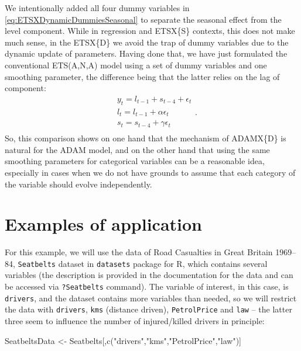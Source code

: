 \documentclass[
]{book}
\newenvironment{Shaded}{\begin{snugshade}}{\end{snugshade}}
\newcommand{\FunctionTok}[1]{\textcolor[rgb]{0.00,0.00,0.00}{#1}}
\newcommand{\NormalTok}[1]{#1}
\newcommand{\OtherTok}[1]{\textcolor[rgb]{0.56,0.35,0.01}{#1}}
\newcommand{\StringTok}[1]{\textcolor[rgb]{0.31,0.60,0.02}{#1}}
\theoremstyle{definition}
\theoremstyle{definition}
\theoremstyle{definition}
\theoremstyle{definition}
\theoremstyle{remark}
\begin{document}
We intentionally added all four dummy variables in \eqref{eq:ETSXDynamicDummiesSeasonal} to separate the seasonal effect from the level component. While in regression and ETSX\{S\} contexts, this does not make much sense, in the ETSX\{D\} we avoid the trap of dummy variables due to the dynamic update of parameters. Having done that, we have just formulated the conventional ETS(A,N,A) model using a set of dummy variables and one smoothing parameter, the difference being that the latter relies on the lag of component:
\begin{equation}
  \begin{aligned}
    & y_{t} = l_{t-1} + s_{t-4} + \epsilon_t \\
    & l_t = l_{t-1} + \alpha \epsilon_t \\
    & s_t = s_{t-4} + \gamma \epsilon_t \\
  \end{aligned} .
  \label{eq:ADAMETSANAQuarterly}
\end{equation}
So, this comparison shows on one hand that the mechanism of ADAMX\{D\} is natural for the ADAM model, and on the other hand that using the same smoothing parameters for categorical variables can be a reasonable idea, especially in cases when we do not have grounds to assume that each category of the variable should evolve independently.

\hypertarget{ETSXRExample}{%
\section{Examples of application}\label{ETSXRExample}}

For this example, we will use the data of Road Casualties in Great Britain 1969--84, \texttt{Seatbelts} dataset in \texttt{datasets} package for R, which contains several variables (the description is provided in the documentation for the data and can be accessed via \texttt{?Seatbelts} command). The variable of interest, in this case, is \texttt{drivers}, and the dataset contains more variables than needed, so we will restrict the data with \texttt{drivers}, \texttt{kms} (distance driven), \texttt{PetrolPrice} and \texttt{law} -- the latter three seem to influence the number of injured/killed drivers in principle:

\begin{Shaded}
\begin{Highlighting}[]
\NormalTok{SeatbeltsData }\OtherTok{\textless{}{-}}\NormalTok{ Seatbelts[,}\FunctionTok{c}\NormalTok{(}\StringTok{"drivers"}\NormalTok{,}\StringTok{"kms"}\NormalTok{,}\StringTok{"PetrolPrice"}\NormalTok{,}\StringTok{"law"}\NormalTok{)]}
\end{Highlighting}
\end{Shaded}
\end{document}
